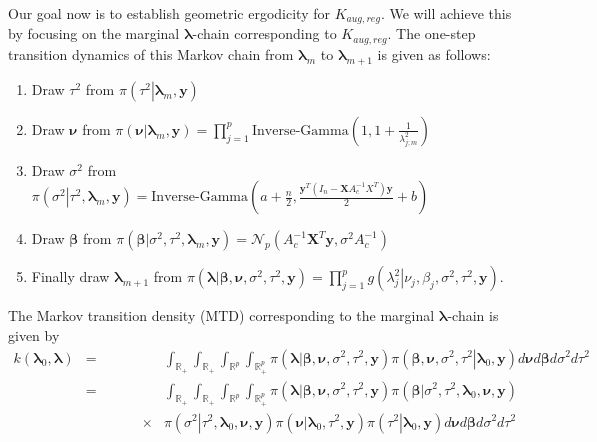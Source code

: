 \documentclass[noinfoline,11pt]{imsart}
\numberwithin{equation}{section}
\theoremstyle{plain}
\newcommand{\y}{\mathbf{y}}
\newcommand{\X}{\mathbf{X}}
\newcommand{\bl}{\boldsymbol{\lambda}}
\begin{document}
Our goal now is to establish geometric ergodicity for $K_{aug,reg}$. We 
will achieve this by focusing on the marginal $\bl$-chain corresponding to 
$K_{aug,reg}$. The one-step transition dynamics of this Markov chain from 
$\bl_m$ to $\bl_{m+1}$ is given as follows:\\
\begin{enumerate}
    \item Draw $\tau^2$ from $\pi\left(\left.\tau^2\right|\mathbf{\bl}_m,\mathbf{\y}\right)$
    \item Draw $\boldsymbol{\nu}$ from $\pi\left(\left.\boldsymbol{\nu}\right|\mathbf{\bl}_m,\mathbf{\y}\right)=\prod\limits_{j=1}^p\text{Inverse-Gamma}\left(1,1+\frac{1}{\lambda_{j;m}^2}\right)$
    \item Draw $\sigma^2$ from $\pi\left(\left.\sigma^2\right|\tau^2,\mathbf{\bl}_m,\mathbf{\y}\right)=\text{Inverse-Gamma}\left(a+\frac{n}{2},\frac{\mathbf{\y}^T\left(I_n-\X A_c^{-1}X^T\right)\mathbf{\y}}{2}+b\right)$
    \item Draw $\boldsymbol{\beta}$ from $\pi\left(\left.\boldsymbol{\beta}\right|\sigma^2,\tau^2,\mathbf{\bl}_m,\mathbf{\y}\right)=\mathcal{N}_p(A_c^{-1}\X^T\y,\sigma^2A_c^{-1})$
    \item Finally draw $\mathbf{\bl}_{m+1}$ from $\pi\left(\left.\mathbf{\bl}\right|\boldsymbol{\beta,\nu},\sigma^2,\tau^2,\mathbf{\y}\right)=\prod\limits_{j=1}^p g\left(\left.\lambda_j^2\right|\nu_j,\beta_j,\sigma^2,\tau^2,\y\right)$. 
\end{enumerate}

The Markov transition density (MTD) corresponding to the marginal $\bl$-chain is given by 
\begin{eqnarray}\label{MTDreghorseshoe}
     k\left(\mathbf{\bl}_0,\mathbf{\bl}\right) &=& \int_{\mathbb{R}_+}\int_{\mathbb{R}_{+}}\int_{\mathbb{R}^p}\int_{\mathbb{R}_+^p}\pi\left(\left.\mathbf{\bl}\right|\boldsymbol{\beta,\nu},\sigma^2,\tau^2,\mathbf{\y}\right)\pi\left(\left.\boldsymbol{\beta,\nu},\sigma^2,\tau^2\right|\mathbf{\bl}_0,\mathbf{\y}\right)d\boldsymbol{\nu}d\boldsymbol{\beta}d\sigma^2d\tau^2 \nonumber\\
   &=& \int_{\mathbb{R}_+}\int_{\mathbb{R}_{+}}\int_{\mathbb{R}^p}\int_{\mathbb{R}^{p}_+}\pi\left(\left.\mathbf{\bl}\right|\boldsymbol{\beta,\nu},\sigma^2,\tau^2,\mathbf{\y}\right)\pi\left(\left.\boldsymbol{\beta}\right|\sigma^2,\tau^2,\mathbf{\bl}_0,\mathbf{\nu,\y}\right)\nonumber \\
    &\qquad \qquad \times& \pi\left(\left.\sigma^2\right|\tau^2,\mathbf{\bl}_0,\mathbf{\nu,\y}\right)\pi\left(\left.\boldsymbol{\nu}\right|\mathbf{\bl}_0,\tau^2,\mathbf{\y}\right)\pi\left(\left.\tau^2\right|\mathbf{\bl}_0,\mathbf{\y}\right)d\boldsymbol{\nu}d\boldsymbol{\beta}d\sigma^2d\tau^2
\end{eqnarray}
\end{document}
